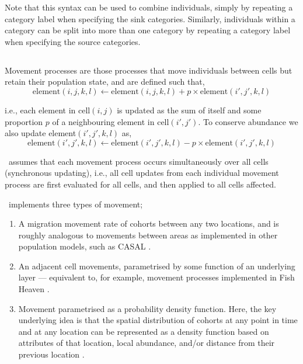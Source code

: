 Note that this syntax can be used to combine individuals, simply by repeating a category label when specifying the sink categories. Similarly, individuals within a category can be split into more than one category by repeating a category label when specifying the source categories.

\subsection{\label{sec:movement-processes}}

Movement processes are those processes that move individuals between cells but retain their population state, and are defined such that,
\begin{equation}
\text{element}(i,j,k,l)\leftarrow \text{element}(i,j,k,l) + p \times \text{element}(i',j',k,l)
\end{equation}

i.e., each element in cell$(i,j)$ is updated as the sum of itself and some proportion $p$ of a neighbouring element in cell$(i',j')$. To conserve abundance we also update element$(i',j',k,l)$ as,
\begin{equation}
\text{element}(i',j',k,l)\leftarrow \text{element}(i',j',k,l) - p\times \text{element}(i',j',k,l)
\end{equation}

\SPM\ assumes that each movement process occurs simultaneously over all cells (synchronous updating), i.e., all cell updates from each individual movement process are first evaluated for all cells, and then applied to all cells affected. 

\SPM\ implements three types of movement;
\begin{enumerate}
	\item  A migration movement rate of cohorts between any two locations, and is roughly analogous to movements between areas as implemented in other population models, such as CASAL \citep{1388}.
	\item An adjacent cell movements, parametrised by some function of an underlying layer --- equivalent to, for example, movement processes implemented in Fish Heaven \citep{1136,1135}. 
	\item Movement parametrised as a probability density function. Here, the key underlying idea is that the spatial distribution of cohorts at any point in time and at any location can be represented as a density function based on attributes of that location, local abundance, and/or distance from their previous location \citep{1366,1367}. 
\end{enumerate}

